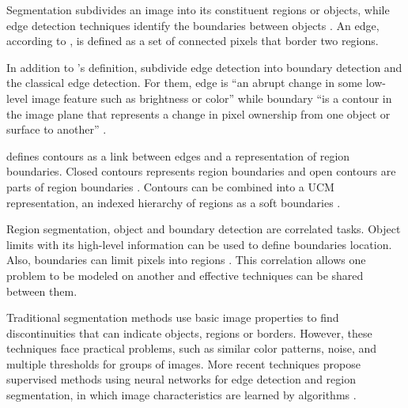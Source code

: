

Segmentation subdivides an image into its constituent regions or objects, while edge detection techniques identify the boundaries between objects \cite{gonzalez2002digital}.
An edge, according to \cite{gonzalez2002digital}, is defined as a set of connected pixels that border two regions.

In addition to \cite{gonzalez2002digital}'s definition, \cite{MARTIN:1273918} subdivide edge detection into boundary detection and the classical edge detection.
For them, edge is ``an abrupt change in some low-level image feature such as brightness or color'' while boundary ``is a contour in the image plane that represents a change in pixel ownership from one object or surface to another'' \cite{MARTIN:1273918}. 

\cite{Jain:1995} defines contours as a link between edges and a representation of region boundaries.
Closed contours represents region boundaries and open contours are parts of region boundaries \cite{Jain:1995} .
Contours can be combined into a UCM representation, an indexed hierarchy of regions as a soft boundaries \cite{Arbelaez:2006}.

Region segmentation, object and boundary detection are correlated tasks.
Object limits with its high-level information can be used to define boundaries location.
Also, boundaries can limit pixels into regions \cite{MARTIN:1273918}.
This correlation allows one problem to be modeled on another and effective techniques can be shared between them.

Traditional segmentation methods use basic image properties to find discontinuities that can indicate objects, regions or borders.
However, these techniques face practical problems, such as similar color patterns, noise, and multiple thresholds for groups of images.
More recent techniques propose supervised methods using neural networks for edge detection and region segmentation, in which image characteristics are learned by algorithms \cite{MARTIN:1273918} \cite{Segnet:2017:7803544}.

